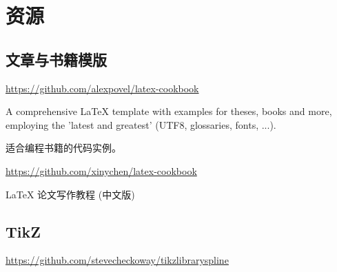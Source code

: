 \chapter{资源}

\section{文章与书籍模版}

\url{https://github.com/alexpovel/latex-cookbook}

A comprehensive LaTeX template with examples for theses, books and more, employing the 'latest and greatest' (UTF8, glossaries, fonts, ...). 

适合编程书籍的代码实例。

\url{https://github.com/xinychen/latex-cookbook}

{\LaTeX} 论文写作教程 (中文版)

\section{TikZ}

\url{https://github.com/stevecheckoway/tikzlibraryspline}